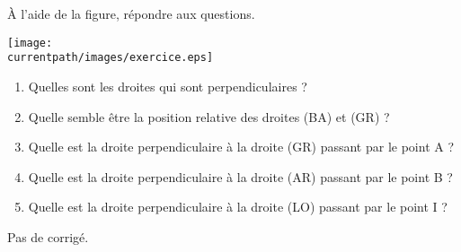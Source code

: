 \begin{exercice*}
    À l'aide de la figure, répondre aux questions.
    \begin{center}
       \texttt{[image: \\currentpath/images/exercice.eps]}
    \end{center}
    \begin{enumerate}
       \item Quelles sont les droites qui sont perpendiculaires ?
       \item Quelle semble être la position relative des droites (BA) et (GR) ?
       \item Quelle est la droite perpendiculaire à la droite (GR) passant par le point A ?
       \item Quelle est la droite perpendiculaire à la droite (AR) passant par le point B ?
       \item Quelle est la droite perpendiculaire à la droite (LO) passant par le point I ?
    \end{enumerate}
 \end{exercice*}
\begin{corrige}
Pas de corrigé.
\end{corrige}
